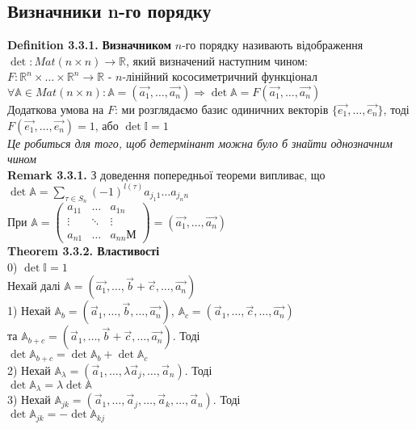 \documentclass[a4paper, 14pt]{extarticle}
\def\huge{\displaystyle}
\def\defin#1{\textbf{Definition {#1}}}
\def\rm#1{\textbf{Remark {#1}}}
\def\th#1{\textbf{Theorem {#1}}}
\def\bigline{\vspace{5mm}\\}
\begin{document}
\subsection{Визначники n-го порядку}
\defin{3.3.1.} \textbf{Визначником} $n$-го порядку називають відображення $\det : Mat(n \times n) \to \mathbb{R}$, який визначений наступним чином:\\
$F: \mathbb{R}^n \times \dots \times \mathbb{R}^n \to \mathbb{R}$ - $n$-лінійний кососиметричний функціонал\\
$\forall \mathbb{A} \in Mat(n \times n): \mathbb{A} = (\vec{a_1},\dots, \vec{a_n}) \Rightarrow \det \mathbb{A} = F(\vec{a_1},\dots,\vec{a_n})$\\
Додаткова умова на $F$: ми розглядаємо базис одиничних векторів $\{\vec{e_1},\dots, \vec{e_n}\}$, тоді $F(\vec{e_1},\dots,\vec{e_n}) = 1$, або $\det \mathbb{I} = 1$\\
\textit{Це робиться для того, щоб детермінант можна було б знайти однозначним чином}
\bigline
\rm{3.3.1.} З доведення попередньої теореми випливає, що\\
$\det \mathbb{A} = \huge \sum_{\tau \in S_n} (-1)^{l(\tau)} a_{j_1 1}\dots a_{j_n n}$\\
При $\mathbb{A} = \begin{pmatrix}
 a_{11} & \dots & a_{1n} \\
 \vdots & \ddots &\vdots \\
 a_{n1} & \dots & a_{nn}М
\end{pmatrix} = (\vec{a_1}, \dots, \vec{a_n})$
\bigline
\th{3.3.2. Властивості}\\
0) $\det \mathbb{I} = 1$\\
Нехай далі $\mathbb{A} = (\vec{a_1},\dots, \vec{b}+\vec{c}, \dots, \vec{a_n})$
\bigline
1) Нехай $\mathbb{A}_b = (\vec{a}_1, \dots, \vec{b}, \dots, \vec{a_n})$, $\mathbb{A}_c = (\vec{a}_1, \dots, \vec{c}, \dots, \vec{a_n})$\\
та $\mathbb{A}_{b+c} = (\vec{a}_1, \dots, \vec{b}+\vec{c}, \dots, \vec{a_n})$. Тоді\\
$\det \mathbb{A}_{b+c} = \det \mathbb{A}_b + \det \mathbb{A}_{c}$
\bigline
2) Нехай $\mathbb{A}_{\lambda} = (\vec{a}_1, \dots, \lambda \vec{a}_j, \dots, \vec{a}_n)$. Тоді\\
$\det \mathbb{A}_{\lambda} = \lambda \det \mathbb{A}$
\bigline
3) Нехай $\mathbb{A}_{jk} = (\vec{a}_1, \dots, \vec{a}_j, \dots, \vec{a}_k, \dots, \vec{a}_n)$. Тоді \\
$\det \mathbb{A}_{jk} = - \det \mathbb{A}_{kj}$\\
\end{document}
